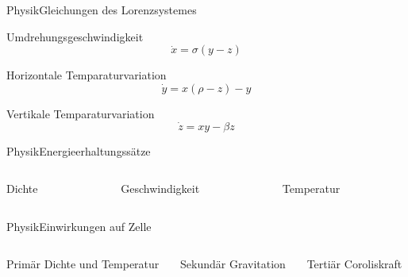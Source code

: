\documentclass[presentation.tex]{subfiles}
\begin{document}
	\begin{frame}{Physik}{Gleichungen des Lorenzsystemes}
		\begin{block}{Umdrehungsgeschwindigkeit}
			\begin{equation}
				\dot{x} = \sigma(y - z)
			\end{equation}
		\end{block}
		\begin{block}{Horizontale Temparaturvariation}
			\begin{equation}
				\dot{y} = x(\rho - z) - y
			\end{equation}
		\end{block}
		\begin{block}{Vertikale Temparaturvariation}
			\begin{equation}
				\dot{z} = xy - \beta z
			\end{equation}
		\end{block}
	\end{frame}
	
	\begin{frame}{Physik}{Energieerhaltungssätze}
		\begin{columns}[c]
			\begin{column}{.3\textwidth}
				\begin{block}{Dichte}
				\end{block}
			\end{column}
			\begin{column}{.3\textwidth}
				Geschwindigkeit
			\end{column}
			\begin{column}{.3\textwidth}
				Temperatur
			\end{column}
		\end{columns}
	\end{frame}

	\begin{frame}{Physik}{Einwirkungen auf Zelle}
		\begin{columns}[c]
			\begin{column}{.3\textwidth}
				\begin{block}{Primär}
					Dichte und Temperatur
				\end{block}
			\end{column}
			\begin{column}{.3\textwidth}
				\begin{block}{Sekundär}
					Gravitation
				\end{block}
			\end{column}
			\begin{column}{0.3\textwidth}
				\begin{block}{Tertiär}
					Coroliskraft
				\end{block}
			\end{column}
		\end{columns}
	\end{frame}
\end{document}
